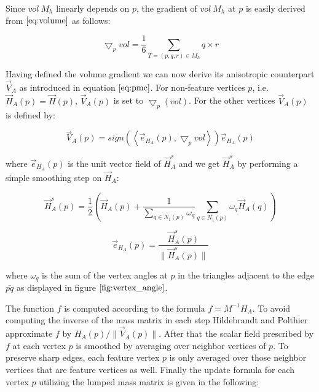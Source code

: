 \documentclass[11pt]{article}
\begin{document}
Since $vol \ M_h$ linearly depends on $p$, the gradient of $vol \ M_h$ at $p$ is easily derived from $\ref{eq:volume}$ as follows:

\begin{equation}
\bigtriangledown_p vol = \frac{1}{6}\sum\limits_{T=(p, q, r) \in M_h}q \times r
\end{equation}

Having defined the volume gradient we can now derive its anisotropic counterpart $\vec{V}_A$ as introduced in equation $\ref{eq:pmc}$. For non-feature vertices $p$, i.e. $\vec{H}_A(p) = \vec{H}(p)$, $\vec{V}_A(p)$ is set to $\bigtriangledown_p(vol)$. For the other vertices $\vec{V}_A(p)$ is defined by:

\begin{equation}
\vec{V}_A(p) = sign\left( \left\langle \vec{e}_{H_A}(p), \bigtriangledown_p vol\right\rangle \right) \vec{e}_{H_A}(p)
\end{equation}

where $\vec{e}_{H_A}(p)$ is the unit vector field of $\vec{H}^s_A$ and we get $\vec{H}^s_A$ by performing a simple smoothing step on $\vec{H}_A$:

\begin{equation}
\vec{H}^s_A(p) = \frac{1}{2}\left( \vec{H}_A(p) + \dfrac{1}{\sum\limits_{q \in N_1(p)} \omega_q}\sum\limits_{q \in N_1(p)}\omega_q\vec{H}_A(q) \right) 
\end{equation}

\begin{equation}
\vec{e}_{H_A}(p) = \dfrac{\vec{H}^s_A(p)}{\parallel \vec{H}^s_A(p) \parallel}
\end{equation}

where $\omega_q$ is the sum of the vertex angles at $p$ in the triangles adjacent to the edge $\bar{pq}$ as displayed in figure $\ref{fig:vertex_angle}$.

The function $f$ is computed according to the formula $f = M^{-1}H_A$. To avoid computing the inverse of the mass matrix in each step Hildebrandt and Polthier \cite{Hildebrandt04anisotropicfiltering} approximate $f$ by $H_A(p)/\parallel \vec{V}_A(p) \parallel$. After that the scalar field prescribed by $f$ at each vertex $p$ is smoothed by averaging over neighbor vertices of $p$. To preserve sharp edges, each feature vertex $p$ is only averaged over those neighbor vertices that are feature vertices as well. Finally the update formula for each vertex $p$ utilizing the lumped mass matrix is given in the following:
\end{document}
